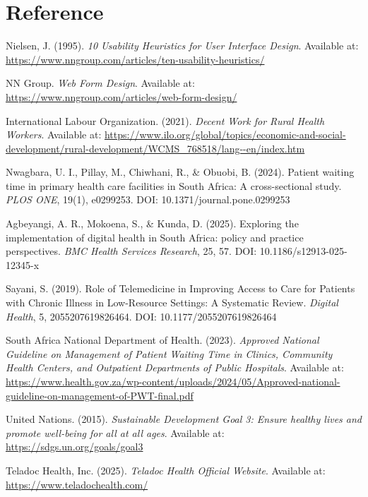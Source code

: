 \chapter{Reference}
\label{chap:ref}

\begin{thebibliography}{99}
    Nielsen, J. (1995). \emph{10 Usability Heuristics for User Interface Design}.
    Available at: \url{https://www.nngroup.com/articles/ten-usability-heuristics/}

    NN Group. \emph{Web Form Design}.
    Available at: \url{https://www.nngroup.com/articles/web-form-design/}

    International Labour Organization. (2021). \emph{Decent Work for Rural Health Workers}.
    Available at: \url{https://www.ilo.org/global/topics/economic-and-social-development/rural-development/WCMS_768518/lang--en/index.htm}

    Nwagbara, U. I., Pillay, M., Chiwhani, R., \& Obuobi, B. (2024). Patient waiting time in primary health care facilities in South Africa: A cross-sectional study. \emph{PLOS ONE}, 19(1), e0299253.
    DOI: 10.1371/journal.pone.0299253

    Agbeyangi, A. R., Mokoena, S., \& Kunda, D. (2025). Exploring the implementation of digital health in South Africa: policy and practice perspectives. \emph{BMC Health Services Research}, 25, 57.
    DOI: 10.1186/s12913-025-12345-x

    Sayani, S. (2019). Role of Telemedicine in Improving Access to Care for Patients with Chronic Illness in Low-Resource Settings: A Systematic Review. \emph{Digital Health}, 5, 2055207619826464.
    DOI: 10.1177/2055207619826464

    South Africa National Department of Health. (2023). \emph{Approved National Guideline on Management of Patient Waiting Time in Clinics, Community Health Centers, and Outpatient Departments of Public Hospitals}.
    Available at: \url{https://www.health.gov.za/wp-content/uploads/2024/05/Approved-national-guideline-on-management-of-PWT-final.pdf}

    United Nations. (2015). \emph{Sustainable Development Goal 3: Ensure healthy lives and promote well-being for all at all ages}.
    Available at: \url{https://sdgs.un.org/goals/goal3}

    Teladoc Health, Inc. (2025). \emph{Teladoc Health Official Website}.
    Available at: \url{https://www.teladochealth.com/}


\end{thebibliography}
